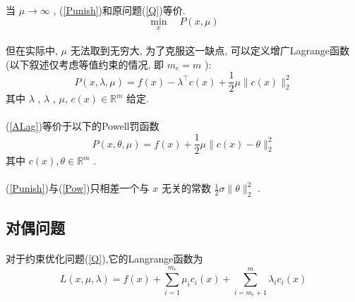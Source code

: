 \documentclass[a4paper, UTF8]{ctexart}				%
\numberwithin{equation}{section}				%
\newcommand{\upcite}[1]{\textsuperscript{\textsuperscript{\cite{#1}}}}
\begin{document}
			\paragraph{}
				\quad 当 $\mu \rightarrow \infty$ , (\ref{Punish})和原问题(\ref{Q})等价.
				\begin{equation}\label{Punish}
					\min_x \quad P(x,\mu)
				\end{equation}

			\paragraph{}
				\quad 但在实际中, $\mu$ 无法取到无穷大, 为了克服这一缺点, 可以定义增广Lagrange函数\upcite{yuan2008nonliner}(以下叙述仅考虑等值约束的情况, 即 $m_e = m$ ):
				\begin{equation}\label{ALag}
						P(x, \lambda, \mu)
					=	f(x) - \lambda^\top c(x) + \frac{1}{2} \mu \lVert{c(x)}\rVert^2_2
				\end{equation}
				其中 $\lambda$ , $\lambda$ , $\mu$, $c(x) \in \mathbb{R}^{m}$ 给定.

			\paragraph{}
				\quad (\ref{ALag})等价于以下的Powell罚函数\upcite{yuan2008nonliner}
				\begin{equation}\label{Pow}
						P(x, \theta, \mu)
					=	f(x) + \frac{1}{2} \mu \lVert{c(x) - \theta}\rVert^2_2
				\end{equation}
				其中 $c(x) , \theta \in \mathbb{R}^{m}$ .

			\paragraph{}
				\quad (\ref{Punish})与(\ref{Pow})只相差一个与 $x$ 无关的常数 $\frac{1}{2} \sigma \lVert{\theta}\rVert^2_2$ .\upcite{yuan2008nonliner}

		\subsection{对偶问题}
			\paragraph{}
				\quad 对于约束优化问题(\ref{Q}),它的Langrange函数为
				\begin{equation}
						L(x, \mu, \lambda)
					=	f(x) + \sum^{m_e}_{i = 1} \mu_i c_i(x) + \sum^{m}_{i = m_e + 1} \lambda_i c_i(x)
				\end{equation}
\end{document}
